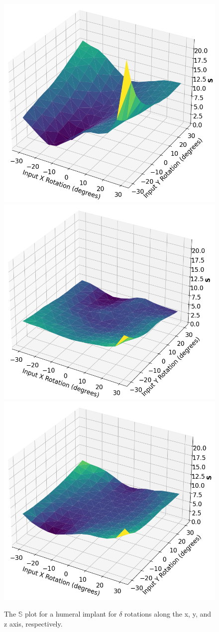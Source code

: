 \begin{figure}[h!]
	\centering
	\includegraphics[width=0.3\linewidth]{Humeral_dx_sensitivity.png}
	\includegraphics[width=0.3\linewidth]{Humeral_dy_sensitivity.png}
	\includegraphics[width=0.3\linewidth]{Humeral_dz_sensitivity.png}
	\caption{The $\mathbb{S}$ plot for a humeral implant for $\delta$ rotations along the x, y, and z axis, respectively.}
	\label{fig:hum_sensitivity_plot}
\end{figure}

